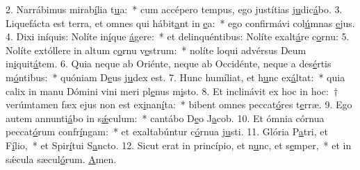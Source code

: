2. Narrábimus mirab\uline{í}lia t\uline{u}a:~* cum accépero tempus, ego justítias j\uline{u}dic\uline{á}bo.
3. Liquefácta est terra, et omnes qui hábit\uline{a}nt in \uline{e}a:~* ego confirmávi col\uline{ú}mnas \uline{e}jus.
4. Dixi iníquis: Nolíte in\uline{í}que \uline{á}gere:~* et delinquéntibus: Nolíte exalt\uline{á}re c\uline{o}rnu:
5. Nolíte extóllere in altum c\uline{o}rnu v\uline{e}strum:~* nolíte loqui advérsus Deum in\uline{i}quit\uline{á}tem.
6. Quia neque ab Oriénte, neque ab Occidénte, neque a des\uline{é}rtis m\uline{ó}ntibus:~* quóniam D\uline{e}us j\uline{u}dex est.
7. Hunc humíliat, et h\uline{u}nc ex\uline{á}ltat:~* quia calix in manu Dómini vini meri pl\uline{e}nus m\uline{i}sto.
8. Et inclinávit ex hoc in hoc:~† verúmtamen fæx ejus non est ex\uline{i}nan\uline{í}ta:~* bibent omnes peccat\uline{ó}res t\uline{e}rræ.
9. Ego autem annunti\uline{á}bo in s\uline{ǽ}culum:~* cantábo D\uline{e}o J\uline{a}cob.
10. Et ómnia córnua peccat\uline{ó}rum confr\uline{í}ngam:~* et exaltabúntur c\uline{ó}rnua j\uline{u}sti.
11. Glória P\uline{a}tri, et F\uline{í}lio,~* et Spir\uline{í}tui S\uline{a}ncto.
12. Sicut erat in princípio, et n\uline{u}nc, et s\uline{e}mper,~* et in sǽcula sæcul\uline{ó}rum. \uline{A}men.
